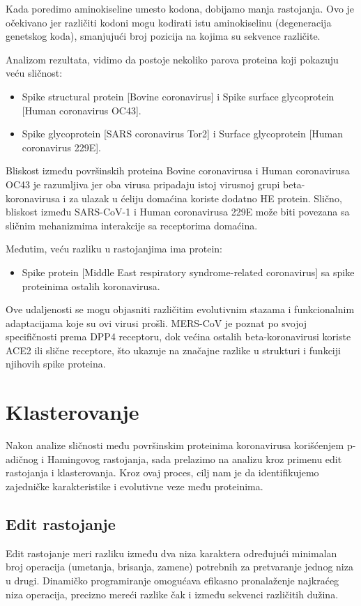 \documentclass[a4paper,12pt]{article}
\begin{document}
\medskip
Kada poredimo aminokiseline umesto kodona, dobijamo manja rastojanja. Ovo je očekivano jer različiti kodoni mogu kodirati istu aminokiselinu (degeneracija genetskog koda), smanjujući broj pozicija na kojima su sekvence različite. 

\bigskip
Analizom rezultata, vidimo da postoje nekoliko parova proteina koji pokazuju veću sličnost:
\begin{itemize}
    \item Spike structural protein [Bovine coronavirus] i Spike surface glycoprotein [Human coronavirus OC43].
    \item Spike glycoprotein [SARS coronavirus Tor2] i Surface glycoprotein [Human coronavirus 229E].
\end{itemize}
Bliskost između površinskih proteina Bovine coronavirusa i Human coronavirusa OC43 je razumljiva jer oba virusa pripadaju istoj virusnoj grupi beta-koronavirusa i za ulazak u ćeliju domaćina koriste dodatno HE protein. Slično, bliskost između SARS-CoV-1 i Human coronavirusa 229E može biti povezana sa sličnim mehanizmima interakcije sa receptorima domaćina.

\medskip
Međutim, veću razliku u rastojanjima ima protein:
\begin{itemize}
    \item Spike protein [Middle East respiratory syndrome-related coronavirus] sa spike proteinima ostalih koronavirusa.
\end{itemize}
Ove udaljenosti se mogu objasniti različitim evolutivnim stazama i funkcionalnim adaptacijama koje su ovi virusi prošli. MERS-CoV je poznat po svojoj specifičnosti prema DPP4 receptoru, dok većina ostalih beta-koronavirusi koriste ACE2 ili slične receptore, što ukazuje na značajne razlike u strukturi i funkciji njihovih spike proteina.

\newpage
\section{Klasterovanje}
Nakon analize sličnosti među površinskim proteinima koronavirusa korišćenjem p-adičnog i Hamingovog rastojanja, sada prelazimo na analizu kroz primenu edit rastojanja i klasterovanja. Kroz ovaj proces, cilj nam je da identifikujemo zajedničke karakteristike i evolutivne veze među proteinima.

\subsection{Edit rastojanje}
Edit rastojanje meri razliku između dva niza karaktera određujući minimalan broj operacija (umetanja, brisanja, zamene) potrebnih za pretvaranje jednog niza u drugi. Dinamičko programiranje omogućava efikasno pronalaženje najkraćeg niza operacija, precizno mereći razlike čak i između sekvenci različitih dužina. 
\end{document}
